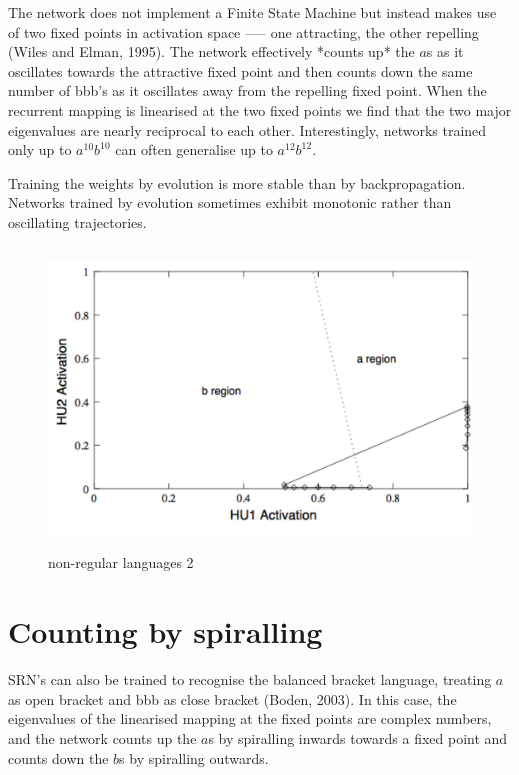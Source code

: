 \documentclass[11pt]{article}
\begin{document}
The network does not implement a Finite State Machine but instead makes use of
two fixed points in activation space ––– one attracting, the other repelling
(Wiles and Elman, 1995).
The network effectively *counts up* the $a$s as it oscillates towards the
attractive fixed point and then counts down the same number of bbb's as it
oscillates away from the repelling fixed point.
When the recurrent mapping is linearised at the two fixed points we find that
the two major eigenvalues are nearly reciprocal to each other.
Interestingly, networks trained only up to $a^{10} b^{10}$ can often generalise
up to $a^{12}b^{12}$.

Training the weights by evolution is more stable than by backpropagation.
Networks trained by evolution sometimes exhibit monotonic rather than
oscillating trajectories.

\begin{figure}[h]
    \centering
    \includegraphics[width=12cm, height=8cm]{../out/images/non-regular-languages-2}
    \caption[non-regular languages 2]{non-regular languages 2}
    \label{fig: non-regular languages 2}
\end{figure}

\section{Counting by spiralling}\label{sec:counting-by-spiralling}
SRN's can also be trained to recognise the balanced bracket language, treating
$a$ as open bracket and bbb as close bracket (Boden, 2003).
In this case, the eigenvalues of the linearised mapping at the fixed points are
complex numbers, and the network counts up the $a$s by spiralling inwards
towards a fixed point and counts down the $b$s by spiralling outwards.
\end{document}
